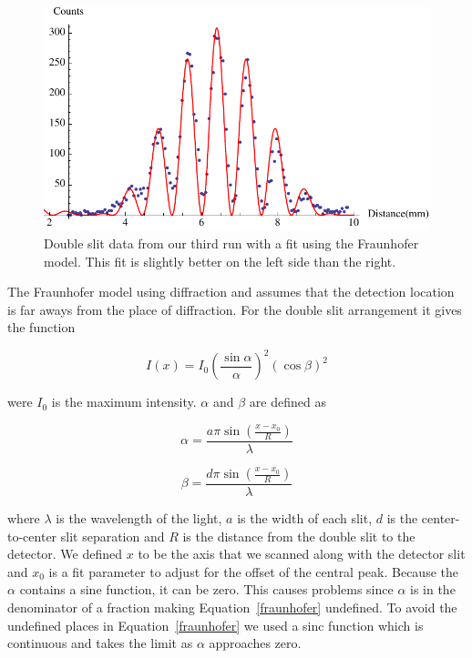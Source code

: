 \documentclass[prb,preprint]{revtex4-1}
\begin{document}
\begin{figure}[h!]
\centering
\includegraphics[width=6in]{doublefraun3.pdf}
\caption{Double slit data from our third run with a fit using the Fraunhofer model. This fit is slightly better on the left side than the right.}
\label{doublefraun3}
\end{figure}

The Fraunhofer model using diffraction and assumes that the detection location is far aways from the place of diffraction. For the double slit arrangement it gives the function

\begin{equation}
\label{fraunhofer}
I(x) = I_0 \left(\frac{\sin\alpha}{\alpha}\right)^2 \left(\cos\beta\right)^2
\end{equation}

were $I_0$ is the maximum intensity. $\alpha$ and $\beta$ are defined as

\begin{equation}
\label{alpha}
\alpha = \frac{a \pi \sin(\frac{x - x_0}{R})}{\lambda}
\end{equation}

\begin{equation}
\label{beta}
\beta = \frac{d \pi \sin(\frac{x - x_0}{R})}{\lambda}
\end{equation}

where $\lambda$ is the wavelength of the light, $a$ is the width of each slit, $d$ is the center-to-center slit separation and $R$ is the distance from the double slit to the detector. We defined $x$ to be the axis that we scanned along with the detector slit and $x_0$ is a fit parameter to adjust for the offset of the central peak.
Because the $\alpha$ contains a sine function, it can be zero. This causes problems since $\alpha$ is in the denominator of a fraction making Equation~\ref{fraunhofer} undefined. To avoid the undefined places in Equation~\ref{fraunhofer} we used a sinc function which is continuous and takes the limit as $\alpha$ approaches zero.
\end{document}
